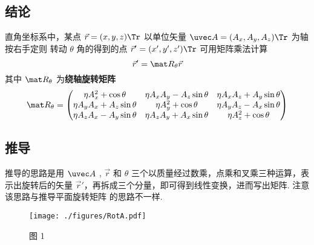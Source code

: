 
\subsection{结论}
直角坐标系中，某点 $\vec r=(x,y,z)\Tr$ 以单位矢量 $\uvec A=({A_x},{A_y},{A_z})\Tr$ 为轴按右手定则%
转动 $\theta$ 角的得到的点 $\vec r'=(x',y',z')\Tr$ 可用矩阵乘法计算
\begin{equation}
\vec r' = {\mat R_\theta }\vec r
\end{equation}
其中 $\mat R_\theta$ 为\textbf{绕轴旋转矩阵}
\begin{equation}
\mat R_\theta =
\begin{pmatrix}
\eta A_x^2 + \cos\theta & \eta A_x A_y - A_z\sin\theta & \eta A_x A_z + A_y\sin\theta\\
\eta A_y A_x + A_z\sin\theta & \eta A_y^2 + \cos\theta & \eta A_y A_z - A_x\sin\theta\\
\eta A_z A_x - A_y \sin\theta & \eta A_z A_y + A_x\sin\theta & \eta A_z^2 + \cos\theta
\end{pmatrix}\end{equation}

\subsection{推导}
推导的思路是用 $\uvec A$ , $\vec r$ 和 $\theta $ 三个以质量经过数乘，点乘和叉乘三种运算，表示出旋转后的矢量 $\vec r'$，再拆成三个分量，即可得到线性变换，进而写出矩阵. 注意该思路与推导平面旋转矩阵 的思路不一样.
\begin{figure}[h]
\centering
\texttt{[image: ./figures/RotA.pdf]}
\caption{图 1}
\end{figure} 

